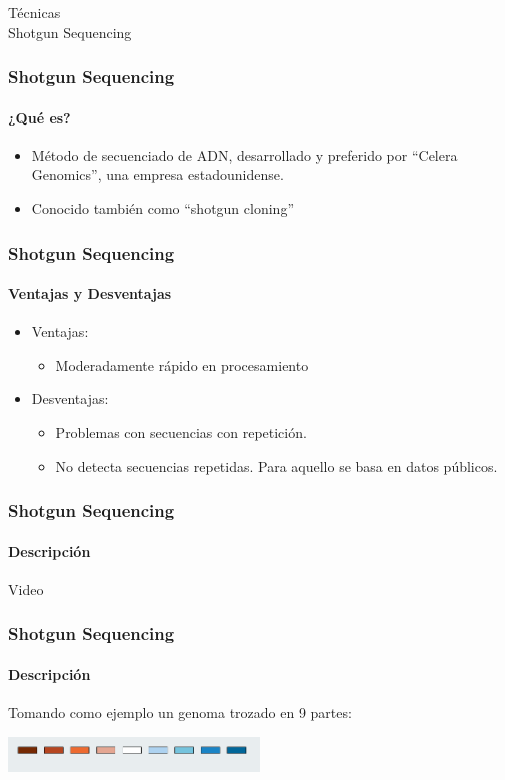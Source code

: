 
\frame
{
\begin{center}
	\Huge{Técnicas}\\
	\huge{Shotgun Sequencing}
\end{center}
}

\frame
{
\frametitle{Shotgun Sequencing}
\framesubtitle{¿Qué es?}

\begin{itemize}
	\item Método de secuenciado de ADN, desarrollado y preferido por ``Celera Genomics'', una empresa estadounidense.
	\item Conocido también como ``shotgun cloning''
\end{itemize}

}

\frame
{
\frametitle{Shotgun Sequencing}
\framesubtitle{Ventajas y Desventajas}

\begin{itemize}
	\item Ventajas:
		\begin{itemize}
			\item Moderadamente rápido en procesamiento
		\end{itemize}
	\item Desventajas:
		\begin{itemize}
			\item Problemas con secuencias con repetición.
			\item No detecta secuencias repetidas. Para aquello se basa en datos públicos.
		\end{itemize}
\end{itemize}

}

\frame
{
\frametitle{Shotgun Sequencing}
\framesubtitle{Descripción}
\begin{center}
	\huge{Video}	
\end{center}

}

\frame
{
\frametitle{Shotgun Sequencing}
\framesubtitle{Descripción}

Tomando como ejemplo un genoma trozado en 9 partes:\\

\begin{center}
	\includegraphics[width=0.5\textwidth]{img/tecnica1-1.png}
\end{center}
}

